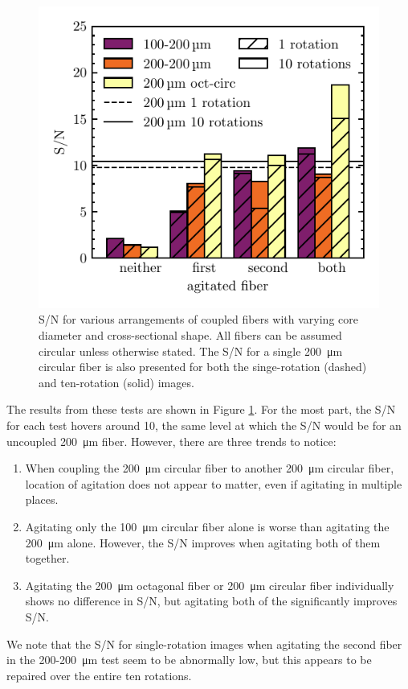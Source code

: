 \documentclass[twocolumn]{emulateapj}
\begin{document}
\begin{figure}
\centering
	\includegraphics[width=\columnwidth]{images/coupled_fibers.pdf}
	\caption{S/N for various arrangements of coupled fibers with varying core diameter and cross-sectional shape. All fibers can be assumed circular unless otherwise stated. The S/N for a single \SI{200}{\micro\meter} circular fiber is also presented for both the singe-rotation (dashed) and ten-rotation (solid) images.}
\label{fig:coupled_fibers}
\end{figure}

The results from these tests are shown in Figure \ref{fig:coupled_fibers}. For the most part, the S/N for each test hovers around 10, the same level at which the S/N would be for an uncoupled \SI{200}{\micro\meter} fiber. However, there are three trends to notice:
\begin{enumerate}
\item When coupling the \SI{200}{\micro\meter} circular fiber to another \SI{200}{\micro\meter} circular fiber, location of agitation does not appear to matter, even if agitating in multiple places.
\item Agitating only the \SI{100}{\micro\meter} circular fiber alone is worse than agitating the \SI{200}{\micro\meter} alone. However, the S/N improves when agitating both of them together.
\item Agitating the \SI{200}{\micro\meter} octagonal fiber or \SI{200}{\micro\meter} circular fiber individually shows no difference in S/N, but agitating both of the significantly improves S/N.
\end{enumerate}
We note that the S/N for single-rotation images when agitating the second fiber in the 200-\SI{200}{\micro\meter} test seem to be abnormally low, but this appears to be repaired over the entire ten rotations.
\end{document}
